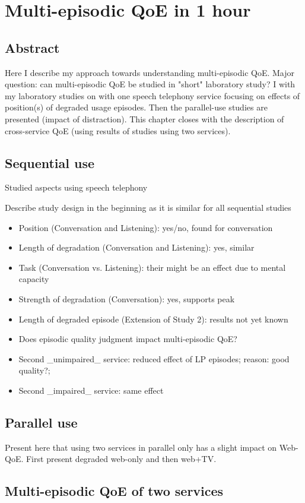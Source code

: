 \chapter{Multi-episodic QoE in 1 hour}\label{chap:06}
\section*{Abstract}
Here I describe my approach towards understanding multi-episodic QoE.
Major question: can multi-episodic QoE be studied in "short" laboratory study?
I with my laboratory studies on with one speech telephony service focusing on effects of position(s) of degraded usage episodes.%
Then the parallel-use studies are presented (impact of distraction).
This chapter closes with the description of cross-service QoE (using results of studies using two services).

\section{Sequential use} %
Studied aspects using speech telephony

Describe study design in the beginning as it is similar for all sequential studies

\begin{itemize}
\item Position (Conversation and Listening): yes/no, found for conversation
\item Length of degradation (Conversation and Listening): yes, similar
\item Task (Conversation vs. Listening): their might be an effect due to mental capacity
\item Strength of degradation (Conversation): yes, supports peak
\item Length of degraded episode (Extension of Study 2): results not yet known %
\item Does episodic quality judgment impact multi-episodic QoE? %
\item Second _unimpaired_ service: reduced effect of LP episodes; reason: good quality?; 
\item Second _impaired_ service: same effect
\end{itemize}

\section{Parallel use}
Present here that using two services in parallel only has a slight impact on Web-QoE.
First present degraded web-only and then web+TV.

\section{Multi-episodic QoE of two services} %